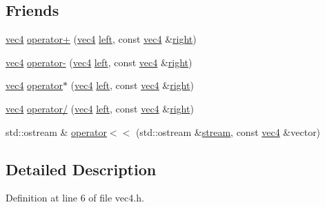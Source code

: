 \subsection*{Friends}
\begin{DoxyCompactItemize}
\item 
\hyperlink{structu__engine_1_1maths_1_1vec4}{vec4} \hyperlink{structu__engine_1_1maths_1_1vec4_a9ec62ee0886928c55c9b6f0288c73c60}{operator+} (\hyperlink{structu__engine_1_1maths_1_1vec4}{vec4} \hyperlink{glew_8h_a6358510bdde486b81c7951ee5c470ee4}{left}, const \hyperlink{structu__engine_1_1maths_1_1vec4}{vec4} \&\hyperlink{glew_8h_a18826d74cd7b4e758c25b4ba66e20be2}{right})
\item 
\hyperlink{structu__engine_1_1maths_1_1vec4}{vec4} \hyperlink{structu__engine_1_1maths_1_1vec4_aefbcaef8da779dca955172b3245c56b0}{operator-\/} (\hyperlink{structu__engine_1_1maths_1_1vec4}{vec4} \hyperlink{glew_8h_a6358510bdde486b81c7951ee5c470ee4}{left}, const \hyperlink{structu__engine_1_1maths_1_1vec4}{vec4} \&\hyperlink{glew_8h_a18826d74cd7b4e758c25b4ba66e20be2}{right})
\item 
\hyperlink{structu__engine_1_1maths_1_1vec4}{vec4} \hyperlink{structu__engine_1_1maths_1_1vec4_a37d87fd93437b19bb5227e993e55e01f}{operator$\ast$} (\hyperlink{structu__engine_1_1maths_1_1vec4}{vec4} \hyperlink{glew_8h_a6358510bdde486b81c7951ee5c470ee4}{left}, const \hyperlink{structu__engine_1_1maths_1_1vec4}{vec4} \&\hyperlink{glew_8h_a18826d74cd7b4e758c25b4ba66e20be2}{right})
\item 
\hyperlink{structu__engine_1_1maths_1_1vec4}{vec4} \hyperlink{structu__engine_1_1maths_1_1vec4_a5a0b11e86fa22f63a08a7e7c21cfcc83}{operator/} (\hyperlink{structu__engine_1_1maths_1_1vec4}{vec4} \hyperlink{glew_8h_a6358510bdde486b81c7951ee5c470ee4}{left}, const \hyperlink{structu__engine_1_1maths_1_1vec4}{vec4} \&\hyperlink{glew_8h_a18826d74cd7b4e758c25b4ba66e20be2}{right})
\item 
std\+::ostream \& \hyperlink{structu__engine_1_1maths_1_1vec4_a6dcd498e1c41ae3faf0d638058aef180}{operator$<$$<$} (std\+::ostream \&\hyperlink{glew_8h_a10d3bc96cdfc1d478f52c13d5ffd9316}{stream}, const \hyperlink{structu__engine_1_1maths_1_1vec4}{vec4} \&vector)
\end{DoxyCompactItemize}


\subsection{Detailed Description}


Definition at line 6 of file vec4.\+h.



